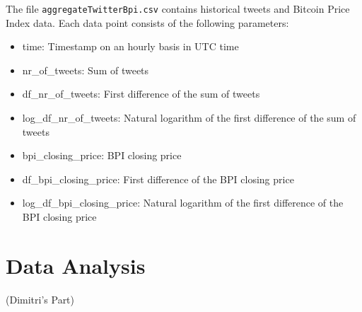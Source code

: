 \documentclass[a4paper,12pt]{article}
\begin{document}
\begin{spacing}{1.2}
The file \verb|aggregateTwitterBpi.csv| contains historical tweets and Bitcoin Price Index data. Each data point consists of the following parameters:
\begin{itemize}
    \item time: Timestamp on an hourly basis in UTC time
    \item {nr\_of\_tweets}: Sum of tweets
    \item {df\_nr\_of\_tweets}: First difference of the sum of tweets
    \item {log\_df\_nr\_of\_tweets}: Natural logarithm of the first difference of the sum of tweets
    \item {bpi\_closing\_price}: BPI closing price
    \item {df\_bpi\_closing\_price}: First difference of the BPI closing price
    \item {log\_df\_bpi\_closing\_price}: Natural logarithm of the first difference of the BPI closing price
\end{itemize}

\section{Data Analysis}
(Dimitri's Part)

\end{spacing}
\clearpage

\printbibliography
\clearpage

\end{document}
